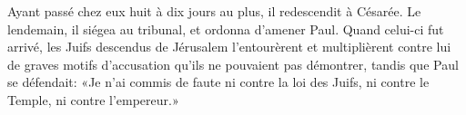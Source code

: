 Ayant passé chez eux huit à dix jours au plus, il redescendit à Césarée.
	Le lendemain, il siégea au tribunal, et ordonna d’amener Paul.
Quand celui-ci fut arrivé,
	les Juifs descendus de Jérusalem l’entourèrent
	et multiplièrent contre lui de graves motifs d’accusation
	qu’ils ne pouvaient pas démontrer,
	tandis que Paul se défendait:
	«Je n’ai commis de faute ni contre la loi des Juifs,
	ni contre le Temple, ni contre l’empereur.»

